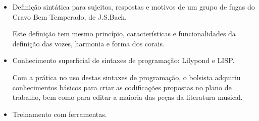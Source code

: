 \documentclass[11pt]{article}
\begin{document}
\begin{itemize}
\begin{figure}
  \centering
  \footnotesize
\begin{verbatim}
(event 'coral-4
  (event 'periodo 1
    (frase 1
      :partial 4
      (harmony
       (center c(vi minor)(i 1)(iv)(i 1)[...])))
    (frase 2
      :partial 4
      (harmony
       (center g(vii dim 1)(i))
       (center c(ii minor)(vi8 minor)[...])))))
\end{verbatim}
  \caption{Sintaxe para harmonia dos corais}
  \label{fig:sintharm}
\end{figure}

Os elementos ``forma'', ``harmonia'' e ``vozes'', no entanto, não
estão relacionados entre si de forma hierárquica. Eles são, ao mesmo
tempo, dependentes e independentes entre si. (c.f. figura
\ref{fig:hcoral}). Este tipo de relação pode ser entendida pelo
seguinte exemplo: as vozes não estão sub-relacionadas à harmonia ou à
forma, porém a forma e a harmonia são o resultado do comportamento
das vozes. Podemos pensar também que as vozes se comportam de acordo
com uma determinada forma. Um outro exemplo é a harmonia, que é
pensada a partir do baixo mas não depende necessariamente dele. Basta
saber o tipo de acorde e a inversão para codificá-la. 

\begin{figure}
  \centering
  \texttt{[image: hierarquias]}
  \caption{Hierarquias do coral}
  \label{fig:hcoral}
\end{figure}

\item Definição sintática para sujeitos, respostas e motivos de um
  grupo de fugas do Cravo Bem Temperado, de J.S.Bach.

Este definição tem mesmo princípio, características e funcionalidades
da definição das vozes, harmonia e forma dos corais.

\item Conhecimento superficial de sintaxes de programação: Lilypond e
  LISP.

  Com a prática no uso destas sintaxes de programação, o bolsista
  adquiriu conhecimentos básicos para criar as codificações propostas
  no plano de trabalho, bem como para editar a maioria das peças da
  literatura musical.

\item Treinamento com ferramentas.


\end{itemize}
\end{document}
